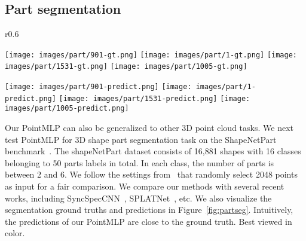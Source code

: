 \subsection{Part segmentation}
\begin{wrapfigure}{r}{0.6\textwidth}
  \vspace{-7mm}
  \begin{center}
    \texttt{[image: images/part/901-gt.png]}
    \texttt{[image: images/part/1-gt.png]}
    \texttt{[image: images/part/1531-gt.png]}
    \texttt{[image: images/part/1005-gt.png]}
    
    
    \texttt{[image: images/part/901-predict.png]}
     \texttt{[image: images/part/1-predict.png]}
    \texttt{[image: images/part/1531-predict.png]}
    \texttt{[image: images/part/1005-predict.png]}
  \end{center}
  \vspace{-2mm}
  \caption{Part segmentation results on ShapeNetPart. Top line is ground truth and bottom line is our prediction.}
  \label{fig:partseg}
  \vspace{-2mm}
\end{wrapfigure}
Our PointMLP can also be generalized to other 3D point cloud tasks. We next test PointMLP for 3D shape part segmentation task on the ShapeNetPart benchmark~\citep{yi2016scalable}. 
The shapeNetPart dataset consists of 16,881 shapes with 16 classes belonging to 50  parts labels in total. In each class, the number of parts is between 2 and 6. We follow the settings from~\citet{qi2017pointnet++} that randomly select 2048 points as input for a fair comparison. We compare our methods with several recent works, including SyncSpecCNN~\citep{yi2017syncspeccnn}, SPLATNet~\citep{su2018splatnet},  etc. 
We also visualize the segmentation ground truths and predictions in Figure~\ref{fig:partseg}. Intuitively, the predictions of our PointMLP are close to the ground truth. Best viewed in color.

